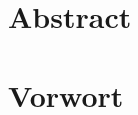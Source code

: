 \documentclass[
	a4paper,
	12pt,
	oneside,
	BCOR=0mm,
	bibliography=totoc,
	parskip=half
]{vwa}
\title{}
\subtitle{}
\author{}
\date{}
\begin{document}
\maketitle

\frontmatter


\chapter*{Abstract}\label{chapter:Abstract}


\chapter*{Vorwort}\label{chapter:Vorwort}


\tableofcontents

\mainmatter
% 

\appendix

\printbibliography

\listoffigures

\selbststaendigkeitserklaerung

\end{document}
